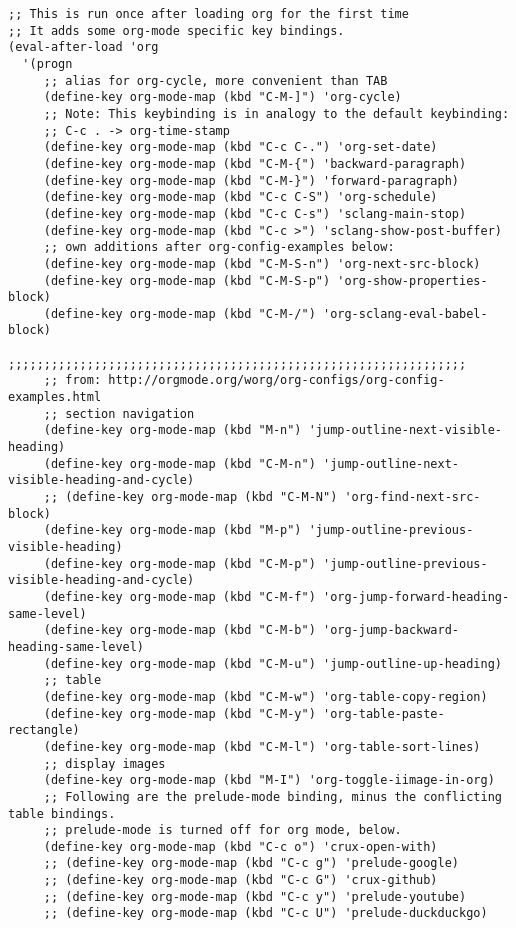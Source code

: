 \documentclass[11pt]{article}
\begin{document}
\begin{verbatim}
;; This is run once after loading org for the first time
;; It adds some org-mode specific key bindings.
(eval-after-load 'org
  '(progn
     ;; alias for org-cycle, more convenient than TAB
     (define-key org-mode-map (kbd "C-M-]") 'org-cycle)
     ;; Note: This keybinding is in analogy to the default keybinding:
     ;; C-c . -> org-time-stamp
     (define-key org-mode-map (kbd "C-c C-.") 'org-set-date)
     (define-key org-mode-map (kbd "C-M-{") 'backward-paragraph)
     (define-key org-mode-map (kbd "C-M-}") 'forward-paragraph)
     (define-key org-mode-map (kbd "C-c C-S") 'org-schedule)
     (define-key org-mode-map (kbd "C-c C-s") 'sclang-main-stop)
     (define-key org-mode-map (kbd "C-c >") 'sclang-show-post-buffer)
     ;; own additions after org-config-examples below:
     (define-key org-mode-map (kbd "C-M-S-n") 'org-next-src-block)
     (define-key org-mode-map (kbd "C-M-S-p") 'org-show-properties-block)
     (define-key org-mode-map (kbd "C-M-/") 'org-sclang-eval-babel-block)
            ;;;;;;;;;;;;;;;;;;;;;;;;;;;;;;;;;;;;;;;;;;;;;;;;;;;;;;;;;;;;;;;;
     ;; from: http://orgmode.org/worg/org-configs/org-config-examples.html
     ;; section navigation
     (define-key org-mode-map (kbd "M-n") 'jump-outline-next-visible-heading)
     (define-key org-mode-map (kbd "C-M-n") 'jump-outline-next-visible-heading-and-cycle)
     ;; (define-key org-mode-map (kbd "C-M-N") 'org-find-next-src-block)
     (define-key org-mode-map (kbd "M-p") 'jump-outline-previous-visible-heading)
     (define-key org-mode-map (kbd "C-M-p") 'jump-outline-previous-visible-heading-and-cycle)
     (define-key org-mode-map (kbd "C-M-f") 'org-jump-forward-heading-same-level)
     (define-key org-mode-map (kbd "C-M-b") 'org-jump-backward-heading-same-level)
     (define-key org-mode-map (kbd "C-M-u") 'jump-outline-up-heading)
     ;; table
     (define-key org-mode-map (kbd "C-M-w") 'org-table-copy-region)
     (define-key org-mode-map (kbd "C-M-y") 'org-table-paste-rectangle)
     (define-key org-mode-map (kbd "C-M-l") 'org-table-sort-lines)
     ;; display images
     (define-key org-mode-map (kbd "M-I") 'org-toggle-iimage-in-org)
     ;; Following are the prelude-mode binding, minus the conflicting table bindings.
     ;; prelude-mode is turned off for org mode, below.
     (define-key org-mode-map (kbd "C-c o") 'crux-open-with)
     ;; (define-key org-mode-map (kbd "C-c g") 'prelude-google)
     ;; (define-key org-mode-map (kbd "C-c G") 'crux-github)
     ;; (define-key org-mode-map (kbd "C-c y") 'prelude-youtube)
     ;; (define-key org-mode-map (kbd "C-c U") 'prelude-duckduckgo)

\end{verbatim}
\end{document}
